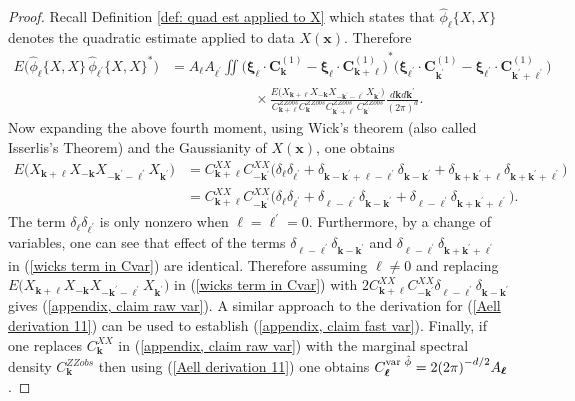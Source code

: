 \documentclass[10pt,noinfoline]{imsart}
\newcommand{\bs}{\boldsymbol}
\begin{document}
\begin{proof}
    Recall Definition \ref{def: quad est applied to X} which states that $\hat\phi_{\bs \ell}\{X,\!X\}$ denotes the quadratic estimate applied to data $X(\bs x)$. Therefore 
    \begin{align}
        E\big(\hat\phi_{\bs \ell}\{X,\!X\} \, \hat\phi_{\bs \ell^\prime}\{X,\!X\}^*\big)
        & = A_{\bs \ell}A_{\bs \ell^\prime}
        \iint
        {\Big(\bs\xi_{\bs \ell} \!\cdot\!\bs C^{{(1)}}_{\bs k} - \bs\xi_{\bs \ell} \!\cdot\!\bs C^{{(1)}}_{\bs k+\bs \ell}\Big)}^{\! *}
        {\Big(\bs\xi_{\bs \ell^\prime} \!\cdot\!\bs C^{{(1)}}_{\bs k^\prime} - \bs\xi_{\bs \ell^\prime} \!\cdot\!\bs C^{{(1)}}_{\bs k^\prime+\bs \ell^\prime}\Big)}^{}\nonumber\\
        &\qquad\qquad\qquad
        \times
        \frac{E\bigl(X_{\bs k+\bs \ell}X_{-\bs k}X_{-\bs k^\prime-\bs\ell^\prime}X_{\bs k^\prime}\bigr)}{C^{ZZobs}_{\bs k+\bs \ell}C^{ZZobs}_{\bs k}C^{ZZobs}_{\bs k^\prime+\bs \ell^\prime}C^{ZZobs}_{\bs k^\prime}}
        \frac{d\bs kd\bs k^\prime}{{(2\pi)}^{d}}.\label{wicks term in Cvar}
    \end{align}
    Now expanding the above fourth moment, using Wick's theorem (also called Isserlis's Theorem) \cite{wick1950evaluation, isserlis1916certain} and the Gaussianity of $X(\bs x)$, one obtains
    \begin{align*}
        E\bigl(X_{\bs k+\bs \ell}X_{-\bs k}X_{-\bs k^\prime-\bs\ell^\prime}X_{\bs k^\prime}\bigr)
        &=C^{X\!X}_{\bs k+\bs \ell}C^{X\!X}_{-\bs k^\prime}\bigl( \delta_{\bs\ell}\delta_{\bs\ell^\prime} +  \delta_{\bs k-\bs k^\prime + \bs \ell-\bs\ell^\prime}\delta_{\bs k-\bs k^\prime} +  \delta_{\bs k + \bs k^\prime +\bs\ell}\delta_{\bs k + \bs k^\prime +\bs\ell^\prime}   \bigr) \\
        &=C^{X\!X}_{\bs k+\bs\ell}C^{X\!X}_{-\bs k^\prime}\bigl( \delta_{\bs\ell}\delta_{\bs\ell^\prime} +  \delta_{ 
        \bs\ell-\bs\ell^\prime}\delta_{\bs k-\bs k^\prime} +  \delta_{\bs\ell-\bs\ell^\prime}\delta_{\bs k+\bs k^\prime +\bs\ell^\prime}   \bigr).
    \end{align*}
    The term $\delta_{\bs\ell}\delta_{\bs\ell^\prime}$ is only nonzero  when $\bs\ell=\bs\ell^\prime=0$. Furthermore, by a change of variables, one can see that effect of the terms $\delta_{ \bs\ell-\bs\ell^\prime}\delta_{\bs k-\bs k^\prime}$ and $ \delta_{\bs\ell-\bs\ell^\prime}\delta_{\bs k+\bs k^\prime +\bs \ell^\prime}$ in (\ref{wicks term in Cvar}) are identical. Therefore assuming $\bs \ell \neq 0$ and replacing  $E\bigl(X_{\bs k+\bs \ell}X_{-\bs k}X_{-\bs k^\prime-\bs\ell^\prime}X_{\bs k^\prime}\bigr)$ in (\ref{wicks term in Cvar}) with $2C^{X\!X}_{\bs k+\bs\ell}C^{X\!X}_{-\bs k^\prime}\delta_{ \bs\ell-\bs\ell^\prime}\delta_{\bs k-\bs k^\prime}$ gives (\ref{appendix, claim raw var}). A similar approach to the derivation for (\ref{Aell derivation 11}) can be used to establish (\ref{appendix, claim fast var}). Finally, if one replaces $C^{X\!X}_{\bs k}$ in (\ref{appendix, claim raw var}) with the marginal spectral density $C^{ZZobs}_{\bs k}$ then using (\ref{Aell derivation 11}) one obtains $C_{\bs\ell}^{\text{\rm var }\hat{\phi}} =  2{(2\pi)}^{-d/2} A_{\bs\ell}$.

\end{proof}
\end{document}
